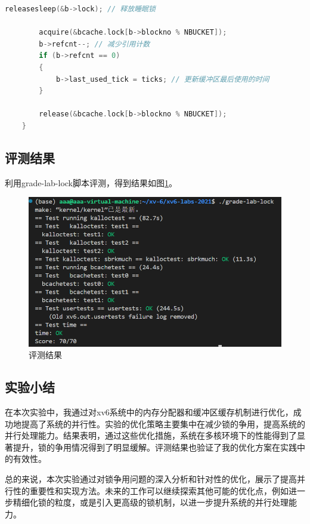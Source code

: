 \begin{enumerate}
\begin{itemize}
\begin{lstlisting}[language=c,title=对brelse函数的修改]
        releasesleep(&b->lock); // 释放睡眠锁

        acquire(&bcache.lock[b->blockno % NBUCKET]);
        b->refcnt--; // 减少引用计数
        if (b->refcnt == 0)
        {
            b->last_used_tick = ticks; // 更新缓冲区最后使用的时间
        }

        release(&bcache.lock[b->blockno % NBUCKET]);
    }
              \end{lstlisting}
          \end{itemize}
\end{enumerate}

\subsection{评测结果}

利用grade-lab-lock脚本评测，得到结果如图\ref{fig:lock}。
\begin{figure}[ht]
    \centering
    \includegraphics[width=\linewidth]{pics/lock评测结果.png}
    \caption{评测结果}
    \label{fig:lock}
\end{figure}

\subsection{实验小结}

在本次实验中，我通过对xv6系统中的内存分配器和缓冲区缓存机制进行优化，成功地提高了系统的并行性。实验的优化策略主要集中在减少锁的争用，提高系统的并行处理能力。结果表明，通过这些优化措施，系统在多核环境下的性能得到了显著提升，锁的争用情况得到了明显缓解。评测结果也验证了我的优化方案在实践中的有效性。

总的来说，本次实验通过对锁争用问题的深入分析和针对性的优化，展示了提高并行性的重要性和实现方法。未来的工作可以继续探索其他可能的优化点，例如进一步精细化锁的粒度，或是引入更高级的锁机制，以进一步提升系统的并行处理能力。






